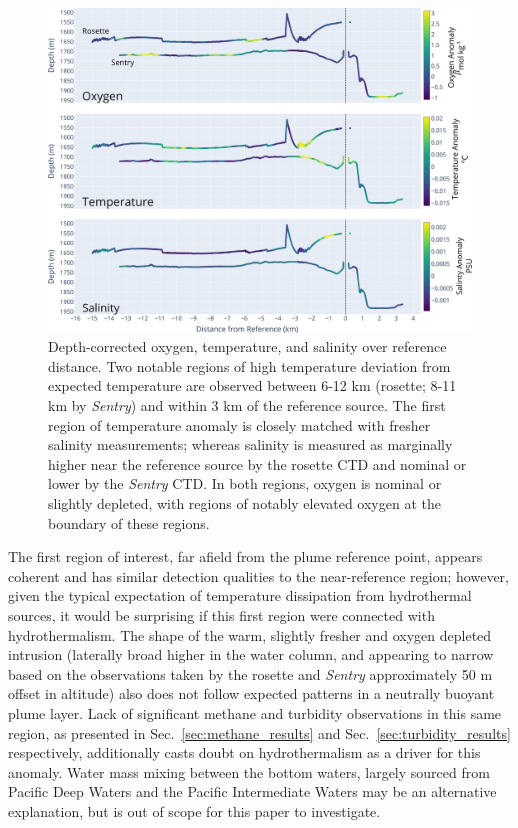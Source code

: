 \begin{figure}[h!]
    \centering
    \includegraphics[width=1\columnwidth]{figures/chap3_o2_temp_salt_over_distance.jpg}
    \caption{Depth-corrected oxygen, temperature, and salinity over reference distance. Two notable regions of high temperature deviation from expected temperature are observed between 6-12 km (rosette; 8-11 km by \emph{Sentry}) and within 3 km of the reference source. The first region of temperature anomaly is closely matched with fresher salinity measurements; whereas salinity is measured as marginally higher near the reference source by the rosette CTD and nominal or lower by the \emph{Sentry} CTD. In both regions, oxygen is nominal or slightly depleted, with regions of notably elevated oxygen at the boundary of these regions.}
    \label{fig:o2_temp_salt}
\end{figure}

The first region of interest, far afield from the plume reference point, appears coherent and has similar detection qualities to the near-reference region; however, given the typical expectation of temperature dissipation from hydrothermal sources, it would be surprising if this first region were connected with hydrothermalism. The shape of the warm, slightly fresher and oxygen depleted intrusion (laterally broad higher in the water column, and appearing to narrow based on the observations taken by the rosette and \emph{Sentry} approximately 50 m offset in altitude) also does not follow expected patterns in a neutrally buoyant plume layer. Lack of significant methane and turbidity observations in this same region, as presented in Sec.~\ref{sec:methane_results} and Sec.~\ref{sec:turbidity_results} respectively, additionally casts doubt on hydrothermalism as a driver for this anomaly. Water mass mixing between the bottom waters, largely sourced from Pacific Deep Waters and the Pacific Intermediate Waters \cite{bray1988water} may be an alternative explanation, but is out of scope for this paper to investigate. 


